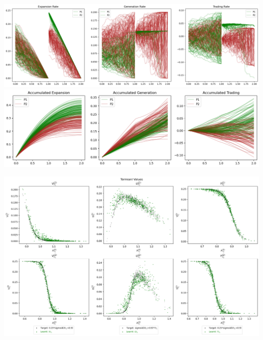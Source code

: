 \documentclass[a4paper,10pt]{article}
\newcommand{\1}{\mathbf{1}}
\begin{document}
\begin{minipage}[h]{\textwidth}
  \centering
  \begin{minipage}[h]{0.75\textwidth} 
    \centering
    \includegraphics{FinalReports/Illustration_diagrams/Seprt-2A2P-Sigmoid-ResExamples/Rates.png}\\
    \includegraphics{FinalReports/Illustration_diagrams/Joint-2A2P-Sigmoid-ResExamples/AccumRates.png}\\
    \label{fig:decomp-gen-jnt}
  \end{minipage}

  \begin{minipage}[h]{0.8\textwidth}
    \centering
    \includegraphics{FinalReports/Illustration_diagrams/Joint-2A2P-Sigmoid-ResExamples/sigmoid_target.png}\\
    \label{fig:terminal-values-jnt}
  \end{minipage}
  \vspace{-10pt}
\end{minipage}
\end{document}
